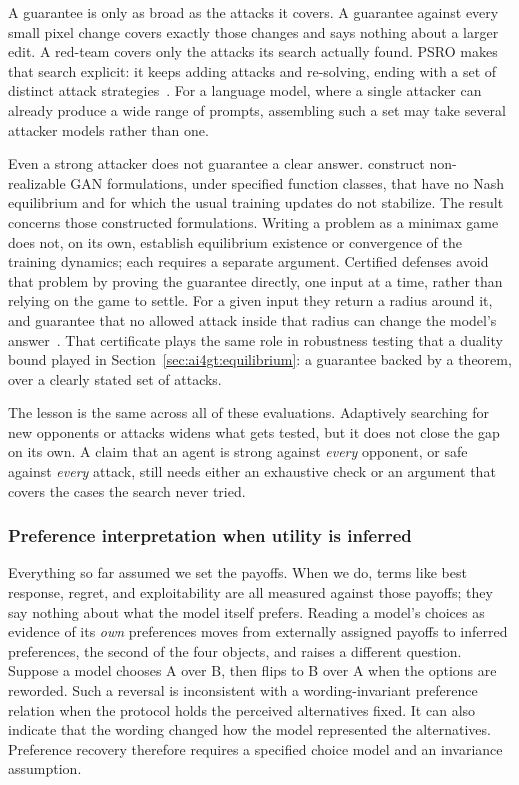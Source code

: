 A guarantee is only as broad as the attacks it covers. A guarantee against every small
pixel change covers exactly those changes and says nothing about a larger edit. A
red-team covers only the attacks its search actually found. PSRO makes that search
explicit: it keeps adding attacks and re-solving, ending with a set of distinct attack
strategies~\citep{Lanctot2017}. For a language model, where a single attacker can
already produce a wide range of prompts, assembling such a set may take several
attacker models rather than one.

Even a strong attacker does not guarantee a clear answer. \citet{FarniaOzdaglar2020}
construct non-realizable GAN formulations, under specified function classes, that
have no Nash equilibrium and for which the usual training updates do not stabilize.
The result concerns those constructed formulations. Writing a problem as a minimax
game does not, on its own, establish equilibrium existence or convergence of the
training dynamics; each requires a separate argument.
Certified defenses avoid that problem by proving the guarantee directly, one input at
a time, rather than relying on the game to settle. For a given input they return a
radius around it, and guarantee that no allowed attack inside that radius can change
the model's answer~\citep{CohenRosenfeldKolter2019}. That certificate plays the same role in robustness testing that a duality
bound played in Section~\ref{sec:ai4gt:equilibrium}: a guarantee backed by a theorem, over a clearly
stated set of attacks.

The lesson is the same across all of these evaluations. Adaptively searching for new
opponents or attacks widens what gets tested, but it does not close the gap on its
own. A claim that an agent is strong against \emph{every} opponent, or safe against
\emph{every} attack, still needs either an exhaustive check or an argument that covers
the cases the search never tried.

\subsubsection{Preference interpretation when utility is inferred}
Everything so far assumed we set the payoffs. When we do, terms like best response,
regret, and exploitability are all measured against those payoffs; they say nothing
about what the model itself prefers. Reading a model's choices as evidence of its
\emph{own} preferences moves from externally assigned payoffs to inferred
preferences, the second of the four objects, and raises a different question. Suppose a model chooses A
over B, then flips to B over A when the options are reworded. Such a reversal is
inconsistent with a wording-invariant preference relation when the protocol holds the
perceived alternatives fixed. It can also indicate that the wording changed how the
model represented the alternatives. Preference recovery therefore requires a specified
choice model and an invariance assumption.

